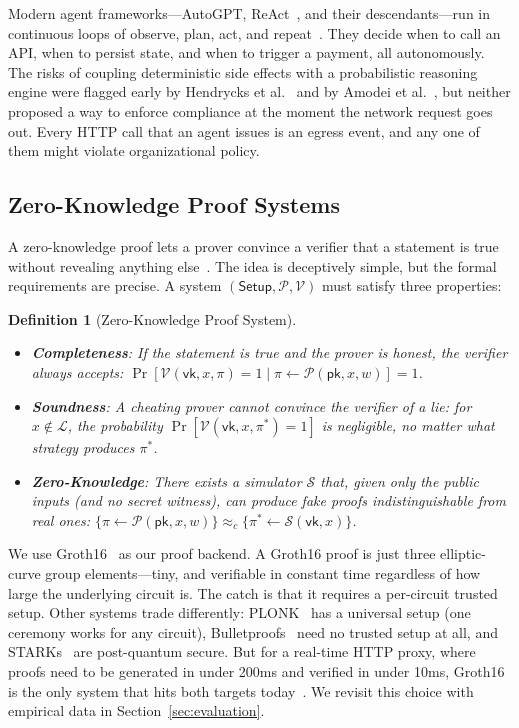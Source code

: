 \documentclass[10pt,conference]{IEEEtran}
\newtheorem{definition}{Definition}
\begin{document}
Modern agent frameworks---AutoGPT, ReAct~\cite{yao2022react}, and their descendants---run in continuous loops of observe, plan, act, and repeat~\cite{wang2024survey}. They decide when to call an API, when to persist state, and when to trigger a payment, all autonomously. The risks of coupling deterministic side effects with a probabilistic reasoning engine were flagged early by Hendrycks et al.~\cite{hendrycks2021unsolved} and by Amodei et al.~\cite{amodei2016concrete}, but neither proposed a way to enforce compliance at the moment the network request goes out. Every HTTP call that an agent issues is an egress event, and any one of them might violate organizational policy.

\subsection{Zero-Knowledge Proof Systems}

A zero-knowledge proof lets a prover convince a verifier that a statement is true without revealing anything else~\cite{goldwasser1989knowledge}. The idea is deceptively simple, but the formal requirements are precise. A system $(\mathsf{Setup}, \mathcal{P}, \mathcal{V})$ must satisfy three properties:

\begin{definition}[Zero-Knowledge Proof System]
\label{def:zkp}
\begin{itemize}
    \item \textbf{Completeness}: If the statement is true and the prover is honest, the verifier always accepts: $\Pr[\mathcal{V}(\textsf{vk}, x, \pi) = 1 \mid \pi \leftarrow \mathcal{P}(\textsf{pk}, x, w)] = 1$.
    \item \textbf{Soundness}: A cheating prover cannot convince the verifier of a lie: for $x \notin \mathcal{L}$, the probability $\Pr[\mathcal{V}(\textsf{vk}, x, \pi^*) = 1]$ is negligible, no matter what strategy produces $\pi^*$.
    \item \textbf{Zero-Knowledge}: There exists a simulator $\mathcal{S}$ that, given only the public inputs (and no secret witness), can produce fake proofs indistinguishable from real ones: $\{\pi \leftarrow \mathcal{P}(\textsf{pk}, x, w)\} \approx_c \{\pi^* \leftarrow \mathcal{S}(\textsf{vk}, x)\}$.
\end{itemize}
\end{definition}

We use Groth16~\cite{groth2016size} as our proof backend. A Groth16 proof is just three elliptic-curve group elements---tiny, and verifiable in constant time regardless of how large the underlying circuit is. The catch is that it requires a per-circuit trusted setup. Other systems trade differently: PLONK~\cite{gabizon2019plonk} has a universal setup (one ceremony works for any circuit), Bulletproofs~\cite{bunz2018bulletproofs} need no trusted setup at all, and STARKs~\cite{ben2018scalable} are post-quantum secure. But for a real-time HTTP proxy, where proofs need to be generated in under 200ms and verified in under 10ms, Groth16 is the only system that hits both targets today~\cite{sharma2023machine, togan2023zero}. We revisit this choice with empirical data in Section~\ref{sec:evaluation}.
\end{document}

